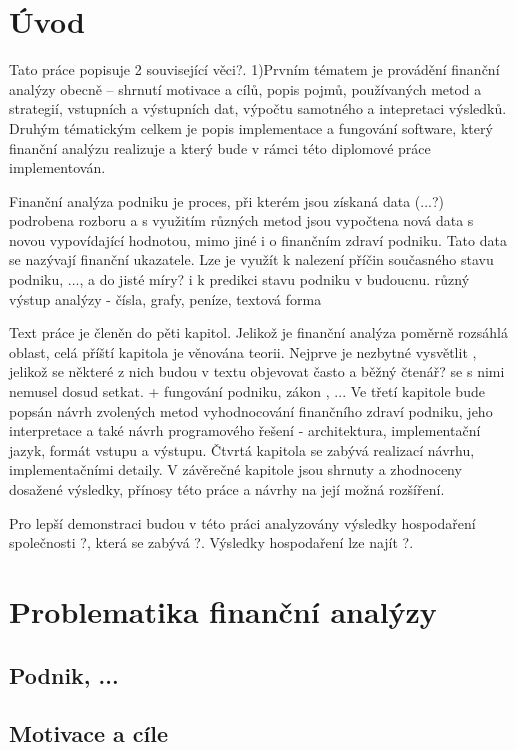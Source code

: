\chapter{Úvod}
Tato práce popisuje 2 související věci?. 
1)Prvním tématem je provádění finanční analýzy obecně -- shrnutí motivace a cílů, popis pojmů, používaných metod a strategií, vstupních a výstupních dat, výpočtu samotného a intepretaci výsledků. Druhým tématickým celkem je popis implementace a fungování software, který finanční analýzu realizuje a který bude v rámci této diplomové práce implementován.

Finanční analýza podniku je proces, při kterém jsou získaná data (...?) podrobena rozboru a s využitím různých metod jsou vypočtena nová data s novou vypovídající hodnotou, mimo jiné i o finančním zdraví podniku. Tato data se nazývají finanční ukazatele. Lze je využít k nalezení příčin současného stavu podniku, ..., a do jisté míry? i k predikci stavu podniku v budoucnu.
různý výstup analýzy - čísla, grafy, peníze, textová forma

Text práce je členěn do pěti kapitol. Jelikož je finanční analýza poměrně rozsáhlá oblast, celá příští kapitola je věnována teorii. Nejprve je nezbytné vysvětlit , jelikož se některé z nich budou v textu objevovat často a běžný čtenář? se s nimi nemusel dosud setkat. + fungování podniku, zákon , ...
Ve třetí kapitole bude popsán návrh zvolených metod vyhodnocování finančního zdraví podniku, jeho interpretace a také návrh programového řešení - architektura, implementační jazyk, formát vstupu a výstupu. Čtvrtá kapitola se zabývá realizací návrhu, implementačními detaily. V závěrečné kapitole jsou shrnuty a zhodnoceny dosažené výsledky, přínosy této práce a návrhy na její možná rozšíření.

Pro lepší demonstraci budou v této práci analyzovány výsledky hospodaření společnosti ?, která se zabývá ?. Výsledky hospodaření lze najít ?.

\chapter{Problematika finanční analýzy}

\section{Podnik, ...}
\section{Motivace a cíle}

